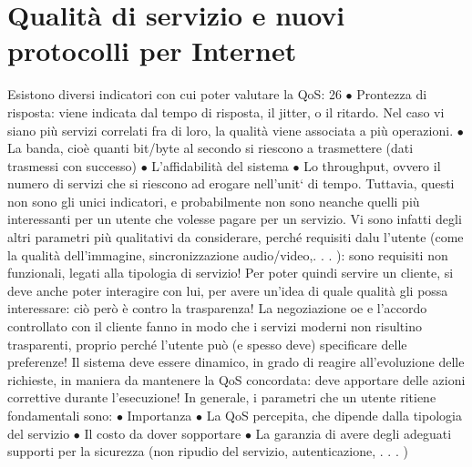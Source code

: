 
\section{Qualità di servizio e nuovi protocolli per Internet}
Esistono diversi indicatori con cui poter valutare la QoS:
26
$\bullet$ Prontezza di risposta: viene indicata dal tempo di risposta, il jitter, o il
ritardo. Nel caso vi siano più servizi correlati fra di loro, la qualità viene
associata a più operazioni.
$\bullet$ La banda, cioè quanti bit/byte al secondo si riescono a trasmettere (dati
trasmessi con successo)
$\bullet$ L'affidabilità del sistema
$\bullet$ Lo throughput, ovvero il numero di servizi che si riescono ad erogare
nell'unit` di tempo.
Tuttavia, questi non sono gli unici indicatori, e probabilmente non sono neanche
quelli più interessanti per un utente che volesse pagare per un servizio. Vi sono
infatti degli altri parametri più qualitativi da considerare, perché requisiti dalu
l'utente (come la qualità dell'immagine, sincronizzazione audio/video,. . . ): sono
requisiti non funzionali, legati alla tipologia di servizio! Per poter quindi servire
un cliente, si deve anche poter interagire con lui, per avere un'idea di quale
qualità gli possa interessare: ciò però è contro la trasparenza! La negoziazione
oe
e l'accordo controllato con il cliente fanno in modo che i servizi moderni non
risultino trasparenti, proprio perché l'utente può (e spesso deve) specificare delle
preferenze! Il sistema deve essere dinamico, in grado di reagire all'evoluzione
delle richieste, in maniera da mantenere la QoS concordata: deve apportare
delle azioni correttive durante l'esecuzione! In generale, i parametri che un
utente ritiene fondamentali sono:
$\bullet$ Importanza
$\bullet$ La QoS percepita, che dipende dalla tipologia del servizio
$\bullet$ Il costo da dover sopportare
$\bullet$ La garanzia di avere degli adeguati supporti per la sicurezza (non ripudio
del servizio, autenticazione, . . . )
